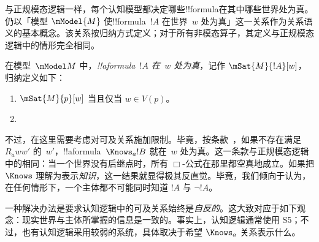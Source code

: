 \documentclass[../../../include/open-logic-section]{subfiles}
\begin{document}


与正规模态逻辑一样，每个认知模型都决定哪些!!{formula}在其中哪些世界处为真。仍以「模型 $\mModel{M}$ 使!!{formula}~$!A$ 在世界~$w$ 处为真」这一关系作为关系语义的基本概念。该关系按归纳方式定义；对于所有非模态算子，其定义与正规模态逻辑中的情形完全相同。

\begin{defn}
  在模型~$\mModel M$ 中，\emph{!!a{formula}~$!A$ 在~$w$ 处为真}，记作
  $\mSat{M}{!A}[w]$，归纳定义如下：
  \begin{enumerate}
  \item $\mSat{M}{p}[w]$ 当且仅当 $w \in V(p)$。
  \item{}
  \end{enumerate}
\end{defn}

不过，在这里需要考虑对可及关系施加限制。毕竟，按条款~，如果不存在满足 $R_a ww'$ 的~$w'$，!!a{formula}~$\Knows_a !B$ 就在~$w$ 处为真。这一条款与正规模态逻辑中的相同：当一个世界没有后继点时，所有 $\Box$-公式在那里都空真地成立。如果把 $\Knows$ 理解为表示\emph{知识}，这一结果就显得极其反直觉。毕竟，我们倾向于认为，在任何情形下，一个主体都不可能同时知道 $!A$ 与 $\lnot !A$。

一种解决办法是要求认知逻辑中的可及关系始终是\emph{自反的}。这大致对应于如下观念：现实世界与主体所掌握的信息是一致的。事实上，认知逻辑通常使用 S5；不过，也有认知逻辑采用较弱的系统，具体取决于希望 $\Knows_a$ 关系表示什么。
\end{document}
